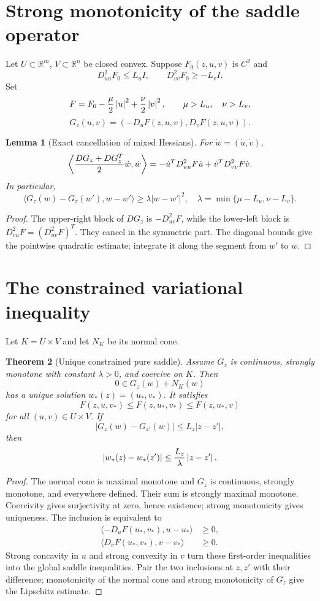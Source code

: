 \documentclass[11pt,reqno]{amsart}
\newtheorem{theorem}{Theorem}[section]
\newtheorem{lemma}[theorem]{Lemma}
\theoremstyle{definition}
\newcommand{\R}{\mathbb R}
\newcommand{\abs}[1]{\left\lvert#1\right\rvert}
\begin{document}
\section{Strong monotonicity of the saddle operator}

Let $U\subset\R^m$, $V\subset\R^n$ be closed convex.  Suppose
$F_0(z,u,v)$ is $C^2$ and
\[
 D_{uu}^2F_0\le L_uI,
 \qquad D_{vv}^2F_0\ge-L_vI.
\]
Set
\[
 F=F_0-{\mu\over2}\abs u^2+{\nu\over2}\abs v^2,
 \qquad \mu>L_u,\quad\nu>L_v,
\]
\[
 G_z(u,v)=(-D_uF(z,u,v),D_vF(z,u,v)).
\]

\begin{lemma}[Exact cancellation of mixed Hessians]\label{lem:mixed}
For $\dot w=(\dot u,\dot v)$,
\[
 \left\langle {DG_z+DG_z^T\over2}\dot w,\dot w\right\rangle
 =-\dot u^TD_{uu}^2F\dot u+
 \dot v^TD_{vv}^2F\dot v.
\]
In particular,
\[
 \langle G_z(w)-G_z(w'),w-w'\rangle
 \ge\lambda\abs{w-w'}^2,
 \quad
 \lambda=\min\{\mu-L_u,\nu-L_v\}.
\]
\end{lemma}

\begin{proof}
The upper-right block of $DG_z$ is $-D_{uv}^2F$, while the lower-left block is
$D_{vu}^2F=(D_{uv}^2F)^T$.  They cancel in the symmetric part.  The diagonal
bounds give the pointwise quadratic estimate; integrate it along the segment
from $w'$ to $w$.
\end{proof}

\section{The constrained variational inequality}

Let $K=U\times V$ and let $N_K$ be its normal cone.

\begin{theorem}[Unique constrained pure saddle]\label{thm:VI}
Assume $G_z$ is continuous, strongly monotone with constant $\lambda>0$, and
coercive on $K$.  Then
\[
 0\in G_z(w)+N_K(w)
\]
has a unique solution $w_*(z)=(u_*,v_*)$.  It satisfies
\[
 F(z,u,v_*)\le F(z,u_*,v_*)\le F(z,u_*,v)
\]
for all $(u,v)\in U\times V$.  If
\[
 \abs{G_z(w)-G_{z'}(w)}\le L_z\abs{z-z'},
\]
then
\[
 \abs{w_*(z)-w_*(z')}\le {L_z\over\lambda}\abs{z-z'}.
\]
\end{theorem}

\begin{proof}
The normal cone is maximal monotone and $G_z$ is continuous, strongly
monotone, and everywhere defined.  Their sum is strongly maximal monotone.
Coercivity gives surjectivity at zero, hence existence; strong monotonicity
gives uniqueness.  The inclusion is equivalent to
\begin{align*}
 \langle-D_uF(u_*,v_*),u-u_*\rangle&\ge0,\\
 \langle D_vF(u_*,v_*),v-v_*\rangle&\ge0.
\end{align*}
Strong concavity in $u$ and strong convexity in $v$ turn these first-order
inequalities into the global saddle inequalities.  Pair the two inclusions at
$z,z'$ with their difference; monotonicity of the normal cone and strong
monotonicity of $G_z$ give the Lipschitz estimate.
\end{proof}
\end{document}
